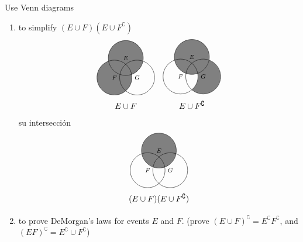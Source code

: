 \item Use Venn diagrams
\begin{enumerate}
    \item to simplify $(E \cup F)(E \cup F^\complement )$
    \[
    \begin{tikzpicture}[scale=0.75]
    \fill[fill=black!50] ( 90:.75) circle (1) (210:.75) circle (1);
    \foreach \a/\l in {90/E,210/F,330/G} {
        \path[draw] ++(\a:.75) circle (1) node {$\scriptstyle \l$};
    }
    \node at (0, -2) {$E \cup F$};
    \end{tikzpicture}
    \hspace{1em}
    \begin{tikzpicture}[scale=0.75]
    \fill[fill=black!50] (90:.75) circle (1);
    \scope[even odd rule]
        \clip ( 90:.75) circle (1) (330:.75) circle (1);
        \clip (210:.75) circle (1) (330:.75) circle (1);
        \fill[fill=black!50] (330:.75) circle (1);
    \endscope
    \foreach \a/\l in {90/E,210/F,330/G} {
        \path[draw] ++(\a:.75) circle (1) node {$\scriptstyle \l$};
    }
    \node at (0, -2) {$E \cup F^\complement $};
    \end{tikzpicture}
    \]
    su intersección
    \[
    \begin{tikzpicture}[scale=0.75]
    \fill[fill=black!50] (90:.75) circle (1);
    \foreach \a/\l in {90/E,210/F,330/G} {
        \path[draw] ++(\a:.75) circle (1) node {$\scriptstyle \l$};
    }
    \node at (0, -2) {$(E \cup F) (E \cup F^\complement )$};
    \end{tikzpicture}
    \]
    \item to prove DeMorgan’s laws for events $E$ and $F$. (prove $(E \cup F)^\complement  = E^\complement F^\complement $, and $(EF)^\complement  = E^\complement  \cup F^\complement $)


\end{enumerate}
